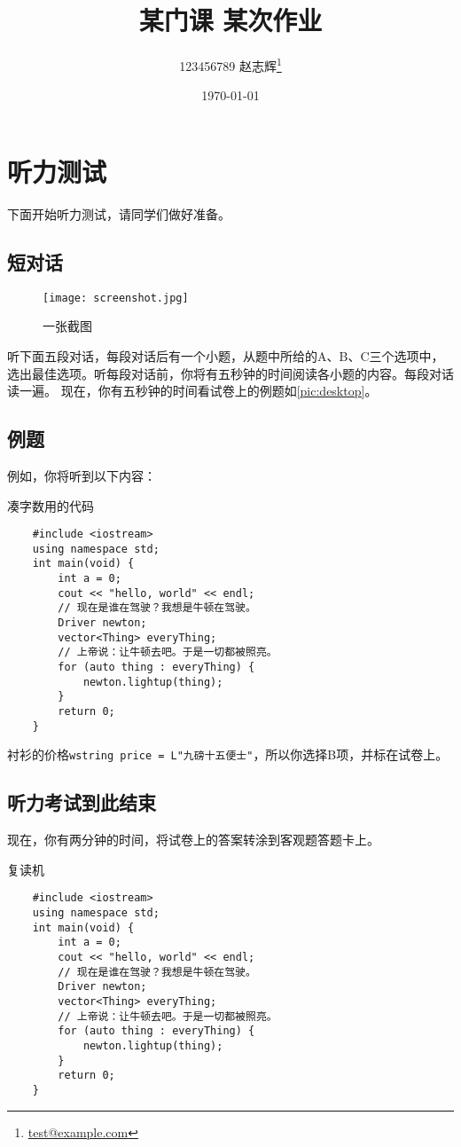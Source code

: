\documentclass{dreamClass}
\title{\heiti\textbf{某门课 \quad 某次作业}}
\author{123456789 \quad 赵志辉\thanks{\href{mailto:test@example.com}{test@example.com}}}
\affil{九乡河文理学院}
\date{\today}
\begin{document}
\maketitle
\thispagestyle{empty}

\section{听力测试}
下面开始听力测试，请同学们做好准备。

\subsection{短对话}
\begin{figure}
    \centering
    \texttt{[image: screenshot.jpg]}
    \caption{一张截图}\label{pic:desktop}
\end{figure}
听下面五段对话，每段对话后有一个小题，从题中所给的A、B、C三个选项中，选出最佳选项。听每段对话前，你将有五秒钟的时间阅读各小题的内容。每段对话读一遍。
现在，你有五秒钟的时间看试卷上的例题如\autoref{pic:desktop}。
\subsection{例题}
例如，你将听到以下内容：
\begin{listing}
    \caption{凑字数用的代码\label{code:junk}}
    \begin{verbatim}
    #include <iostream>
    using namespace std;
    int main(void) {
        int a = 0;
        cout << "hello, world" << endl;
        // 现在是谁在驾驶？我想是牛顿在驾驶。
        Driver newton;
        vector<Thing> everyThing;
        // 上帝说：让牛顿去吧。于是一切都被照亮。
        for (auto thing : everyThing) {
            newton.lightup(thing);
        }
        return 0;
    }
    \end{verbatim}
\end{listing}
衬衫的价格\texttt{wstring price = L"九磅十五便士"}，所以你选择B项，并标在试卷上。

\subsection{听力考试到此结束}
现在，你有两分钟的时间，将试卷上的答案转涂到客观题答题卡上。
\begin{codeblock}
    \caption{复读机\label{code:junk-again}}
    \begin{verbatim}
    #include <iostream>
    using namespace std;
    int main(void) {
        int a = 0;
        cout << "hello, world" << endl;
        // 现在是谁在驾驶？我想是牛顿在驾驶。
        Driver newton;
        vector<Thing> everyThing;
        // 上帝说：让牛顿去吧。于是一切都被照亮。
        for (auto thing : everyThing) {
            newton.lightup(thing);
        }
        return 0;
    }
    \end{verbatim}
\end{codeblock}
\end{document}
